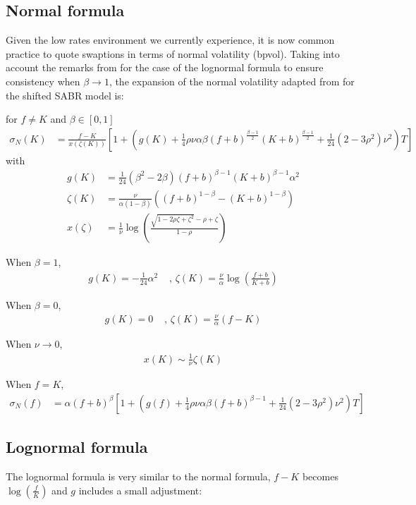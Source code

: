 \documentclass[]{rAMF2e}
\begin{document}
\subsection{Normal formula}
Given the low rates environment we currently experience, it is now common practice to quote swaptions in terms of normal volatility (bpvol). Taking into account the remarks from \citet{obloj2008fine} for the case of the lognormal formula to ensure consistency when $\beta \to 1$, the expansion of the normal volatility adapted from \citet{hagan2002managing} for the shifted SABR model is:

for $f \neq K$ and $\beta \in [0,1]$
\begin{align}
\label{eqn:normal_sabr}
\sigma_N(K) &= \frac{f-K}{x(\zeta(K))}\left[1+\left(g(K)+\frac{1}{4}\rho\nu\alpha\beta(f+b)^{\frac{\beta-1}{2}}(K+b)^{\frac{\beta-1}{2}}+\frac{1}{24}(2-3\rho^2)\nu^2\right)T\right]
\end{align}
with 
\begin{align}
g(K) &= \frac{1}{24} (\beta^2-2\beta) (f+b)^{\beta-1} (K+b)^{\beta-1} \alpha^2\\
\label{eqn:lognormal_zeta}
\zeta(K) &= \frac{\nu}{\alpha (1-\beta)} \left( (f+b)^{1-\beta} - (K+b)^{1-\beta} \right)\\
\label{eqn:lognormal_x}
x(\zeta) &= \frac{1}{\nu}\log\left(\frac{\sqrt{1-2\rho\zeta+\zeta^2}-\rho+\zeta}{1-\rho} \right)
\end{align}

When $\beta = 1$,
\begin{align*}
g(K) = -\frac{1}{24}\alpha^2 &\texttt{ , } \zeta(K) = \frac{\nu}{\alpha} \log\left(\frac{f+b}{K+b}\right)
\end{align*}

When $\beta = 0$,
\begin{align*}
g(K) = 0 &\texttt{ , }\zeta(K) = \frac{\nu}{\alpha} \left(f-K\right)
\end{align*}

When $\nu \to 0$,
\begin{align*}
x(K) \sim \frac{1}{\nu}\zeta(K)
\end{align*}

When $f=K$, 
\begin{align}
\sigma_N(f) &= \alpha (f+b)^\beta \left[1+\left(g(f)+\frac{1}{4}\rho\nu\alpha\beta(f+b)^{\beta-1}+\frac{1}{24}(2-3\rho^2)\nu^2\right)T\right]
\end{align}
\subsection{Lognormal formula}
The lognormal formula is very similar to the normal formula, $f-K$ becomes $\log(\frac{f}{K})$ and $g$ includes a small adjustment:
\end{document}
